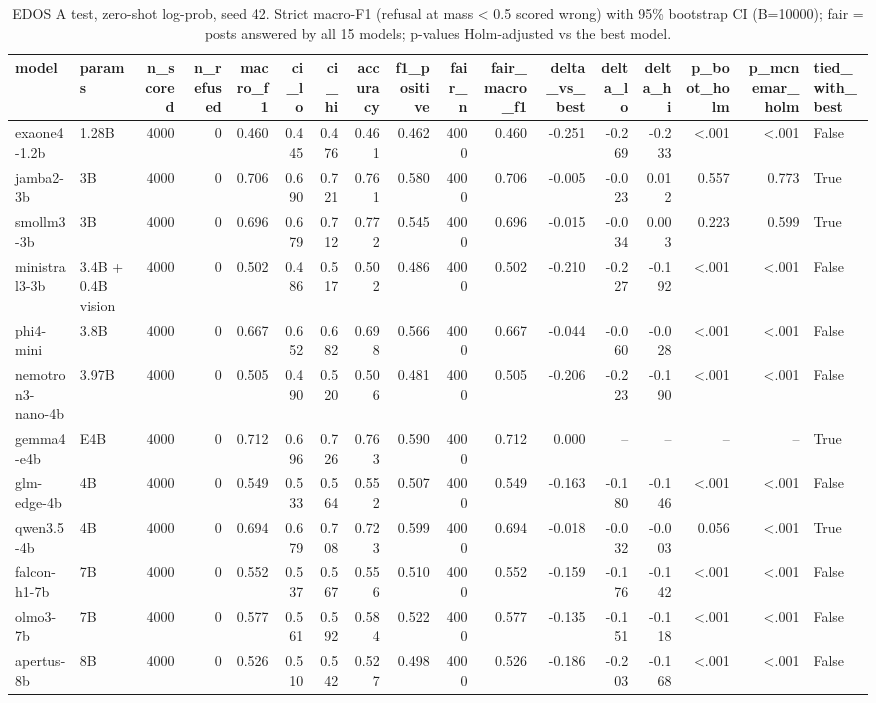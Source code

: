 \begin{table}[t]
\caption{EDOS A test, zero-shot log-prob, seed 42. Strict macro-F1 (refusal at mass < 0.5 scored wrong) with 95\% bootstrap CI (B=10000); fair = posts answered by all 15 models; p-values Holm-adjusted vs the best model.}
\label{tab:main_edos_task_a}
\begin{tabular}{llrrrrrrrrrrrrrrl}
\toprule
model & params & n_scored & n_refused & macro_f1 & ci_lo & ci_hi & accuracy & f1_positive & fair_n & fair_macro_f1 & delta_vs_best & delta_lo & delta_hi & p_boot_holm & p_mcnemar_holm & tied_with_best \\
\midrule
exaone4-1.2b & 1.28B & 4000 & 0 & 0.460 & 0.445 & 0.476 & 0.461 & 0.462 & 4000 & 0.460 & -0.251 & -0.269 & -0.233 & <.001 & <.001 & False \\
jamba2-3b & 3B & 4000 & 0 & 0.706 & 0.690 & 0.721 & 0.761 & 0.580 & 4000 & 0.706 & -0.005 & -0.023 & 0.012 & 0.557 & 0.773 & True \\
smollm3-3b & 3B & 4000 & 0 & 0.696 & 0.679 & 0.712 & 0.772 & 0.545 & 4000 & 0.696 & -0.015 & -0.034 & 0.003 & 0.223 & 0.599 & True \\
ministral3-3b & 3.4B + 0.4B vision & 4000 & 0 & 0.502 & 0.486 & 0.517 & 0.502 & 0.486 & 4000 & 0.502 & -0.210 & -0.227 & -0.192 & <.001 & <.001 & False \\
phi4-mini & 3.8B & 4000 & 0 & 0.667 & 0.652 & 0.682 & 0.698 & 0.566 & 4000 & 0.667 & -0.044 & -0.060 & -0.028 & <.001 & <.001 & False \\
nemotron3-nano-4b & 3.97B & 4000 & 0 & 0.505 & 0.490 & 0.520 & 0.506 & 0.481 & 4000 & 0.505 & -0.206 & -0.223 & -0.190 & <.001 & <.001 & False \\
gemma4-e4b & E4B & 4000 & 0 & 0.712 & 0.696 & 0.726 & 0.763 & 0.590 & 4000 & 0.712 & 0.000 & -- & -- & -- & -- & True \\
glm-edge-4b & 4B & 4000 & 0 & 0.549 & 0.533 & 0.564 & 0.552 & 0.507 & 4000 & 0.549 & -0.163 & -0.180 & -0.146 & <.001 & <.001 & False \\
qwen3.5-4b & 4B & 4000 & 0 & 0.694 & 0.679 & 0.708 & 0.723 & 0.599 & 4000 & 0.694 & -0.018 & -0.032 & -0.003 & 0.056 & <.001 & True \\
falcon-h1-7b & 7B & 4000 & 0 & 0.552 & 0.537 & 0.567 & 0.556 & 0.510 & 4000 & 0.552 & -0.159 & -0.176 & -0.142 & <.001 & <.001 & False \\
olmo3-7b & 7B & 4000 & 0 & 0.577 & 0.561 & 0.592 & 0.584 & 0.522 & 4000 & 0.577 & -0.135 & -0.151 & -0.118 & <.001 & <.001 & False \\
apertus-8b & 8B & 4000 & 0 & 0.526 & 0.510 & 0.542 & 0.527 & 0.498 & 4000 & 0.526 & -0.186 & -0.203 & -0.168 & <.001 & <.001 & False \\

\end{tabular}
\end{table}
